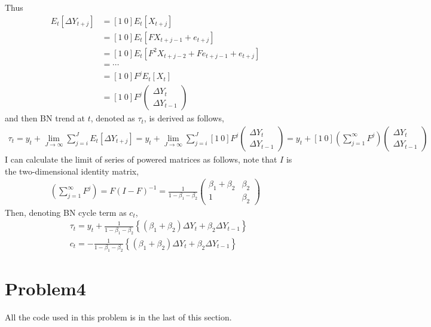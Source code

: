 \documentclass{article}
\begin{document}
 Thus
\begin{align*}
	E_t \left[\Delta Y_{t+j}\right] &= [1\ 0 ]E_t \left[X_{t+j}\right]\\
	&= [1\ 0] E_t \left[ F X_{t+j-1} + e_{t+j} \right]\\
	&= [1\ 0] E_t \left[ F^2 X_{t+j-2} + F e_{t+j-1} + e_{t+j}\right]\\
	&= \cdots\\
	&= [1\ 0] F^j E_t \left[ X_t \right]\\
	&= [1\ 0] F^j \begin{pmatrix} \Delta Y_t\\ \Delta Y_{t-1} \end{pmatrix}
\end{align*}
and then BN trend at $t$, denoted as $\tau_t$, is derived as follows,
\begin{align*}
	\tau_t = y_t + \lim_{J \to \infty} \sum_{j = i}^J E_t\left[ \Delta Y_{t+j} \right] = y_t +  \lim_{J \to \infty} \sum_{j = i}^J [1\ 0] F^j \begin{pmatrix} \Delta Y_t\\ \Delta Y_{t-1} \end{pmatrix} = y_t + [1\ 0] \left( \sum_{j=1}^{\infty} F^j \right) \begin{pmatrix} \Delta Y_t\\ \Delta Y_{t-1} \end{pmatrix}
\end{align*}
I can calculate the limit of series of powered matrices as follows, note that $I$ is the two-dimensional identity matrix,
\begin{align*}
	 \left( \sum_{j=1}^{\infty} F^j \right) = F \left( I - F\right)^{-1} = \frac{1}{1-\beta_1 -\beta_2} \begin{pmatrix} \beta_1 + \beta_2 & \beta_2\\ 1 & \beta_2 \end{pmatrix}
\end{align*}
Then, denoting BN cycle term as $c_t$,  
\begin{align*}
	&\tau_t = y_t + \frac{1}{1-\beta_1 -\beta_2} \left\{ (\beta_1 + \beta_2)\Delta Y_t + \beta_2 \Delta Y_{t-1} \right\}\\
	&c_t = - \frac{1}{1-\beta_1 -\beta_2} \left\{ (\beta_1 + \beta_2)\Delta Y_t + \beta_2 \Delta Y_{t-1} \right\}
\end{align*}


\section{Problem4}
 All the code used in this problem is in the last of this section.
 
\end{document}
